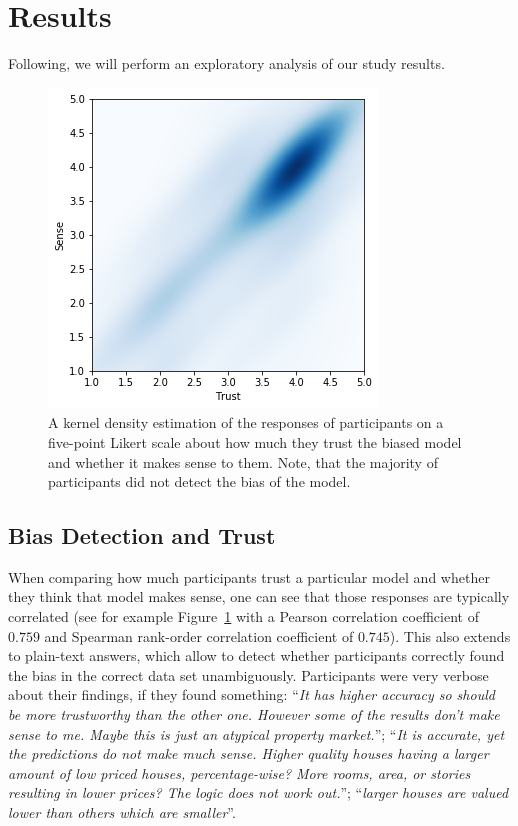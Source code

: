 \section{Results}
\label{sec:results}
Following, we will perform an exploratory analysis of our study results.

\begin{figure}
\centering
\includegraphics[width=0.45\linewidth]{aggexplain/stats/tvss}%
\caption[Trust and whether the model makes sense.]{
A kernel density estimation of the responses of participants on a five-point Likert scale
about how much they trust the biased model and whether it makes sense to them.
Note, that the majority of participants did not detect the bias of the model.
}
\label{figs:tvss}
\end{figure}

\subsection{Bias Detection and Trust}

When comparing how much participants trust a particular model and whether they think that model makes sense, one can see that those responses are typically correlated (see for example Figure~\ref{figs:tvss} with a Pearson correlation coefficient of $0.759$ and Spearman rank-order correlation coefficient of $0.745$).
This also extends to plain-text answers, which allow to detect whether participants correctly found the bias in the correct data set unambiguously.
Participants were very verbose about their findings, if they found something:
``\emph{It has higher accuracy so should be more trustworthy than the other one. However some of the results don't make sense to me. Maybe this is just an atypical property market.}'';
``\emph{It is accurate, yet the predictions do not make much sense. Higher quality houses having a larger amount of low priced houses, percentage-wise? More rooms, area, or stories resulting in lower prices? The logic does not work out.}'';
``\emph{larger houses are valued lower than others which are smaller}''.

